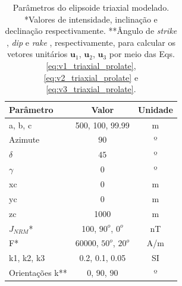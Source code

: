 \begin{table}[h!]
	\begin{center}
		\begin{tabular}{|l|c|c|}
			\hline
			\textbf{Parâmetro}  & \textbf{Valor}  & \textbf{Unidade} \\
			\hline 
			a, b, c  & 500, 100, 99.99 & m\\
			\hline
			Azimute   & $90$ & º\\
			\hline
			$\delta$    & $45$ & º\\
			\hline
			$\gamma$   & $0$  & º\\
			\hline
			xc   & 0 & m \\
			\hline          
			yc   & 0  & m\\
			\hline                
			zc   & 1000  & m\\
			\hline
			$J_{NRM}$*  & 100, $90^o$, $0^o$  & nT\\
			\hline
			F*    & 60000, $50^o$, $20^o$ & A/m\\
			\hline
			k1, k2, k3   & 0.2, 0.1, 0.05  & SI\\
			\hline
			Orientações k**   & $0$, $90$, $90$  & º\\
			\hline
		\end{tabular}
		\caption{Parâmetros do elipsoide triaxial modelado. *Valores de intensidade, inclinação e declinação respectivamente. **Ângulo de \textit{strike} , \textit{dip}  e \textit{rake} , respectivamente, para calcular os vetores unitários $\mathbf{u}_{1}$, $\mathbf{u}_{2}$, $\mathbf{u}_{3}$ por meio das Eqs. \ref{eq:v1_triaxial_prolate}, \ref{eq:v2_triaxial_prolate} e \ref{eq:v3_triaxial_prolate}.}
	\end{center}
	\label{tab:triaxial_prolate1}
\end{table}

\vspace{2cm}

